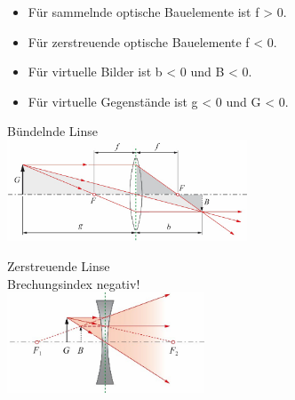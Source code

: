 \begin{center}
	\begin{minipage}{0.2\textwidth}
		 \\
		
		 \\
		 \\
		 \\
		 \\
	\end{minipage}%
	\begin{minipage}{0.4\textwidth}
		\begin{itemize}
			\setlength\itemsep{-0.5 em}
			\item Für sammelnde optische Bauelemente ist f > 0.
			\item Für zerstreuende optische Bauelemente f < 0.
			\item Für virtuelle Bilder ist b < 0 und B < 0.
			\item Für virtuelle Gegenstände ist g <	0 und G < 0.
		\end{itemize}
	\end{minipage}
\end{center}

\begin{center}
	\begin{minipage}{0.3\textwidth}
		Bündelnde Linse \\
		\includegraphics[height=3cm,keepaspectratio=true]{Images/buendelndelinse.png}
	\end{minipage}%
	\begin{minipage}{0.3\textwidth}
		Zerstreuende Linse \\
		Brechungsindex negativ! \\
		\includegraphics[height=3cm,keepaspectratio=true]{Images/streuendelinse.png}
	\end{minipage}
\end{center}

